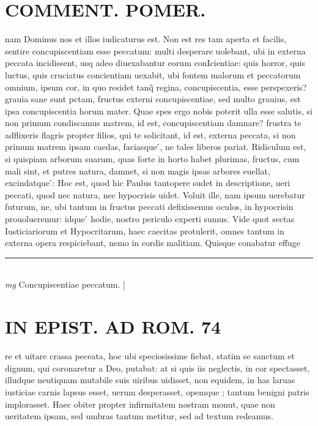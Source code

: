 \documentclass{article}
\begin{document}
\begin{pages}
\section*{COMMENT. POMER.  }\pstart nam Dominus nos et illos iudicaturus est. Non est res tam aperta et facilis, sentire concupiscentiam esse peccatum: multi desperare uolebant, ubi in externa peccata incidissent, usq adeo diuexabantur eorum conIcientiae: quis horror, quis luctus, quis cruciatus concientiam uexabit, ubi fontem malorum et peccatorum omnium, ipsum cor, in quo residet tanq̃ regina, concupiscentia, esse perspexeris? grauia sane sunt pctam, fructus externi concupiscentiae, sed multo grauius, est ipsa concupiscentia horum mater. Quae spes ergo nobis poterit ulla esse salutis, si non primum condiscamus matrem, id est, concupiscentiam damnare? frustra te adflixeris flagris propter filios, qui te solicitant, id est, externa peccata, si non primum matrem ipsam caedas, faciasque ́, ne tales liberos pariat. Ridiculum est, si quispiam arborum suarum, quas forte in horto habet plurimas, fructus, cum mali sint, et putres natura, damnet, si non magis ipsas arbores euellat, excindatque ́: Hoc est, quod hic Paulus tantopere sudet in descriptione, ueri peccati, quod nec natura, nec hypocrisis uidet. Voluit ille, nam ipsum uerebatur futurum, ne, ubi tantum in fructus peccati defixissemus oculos, in hypocrisin prouolueremur: idque ́ hodie, nostro periculo experti sumus. Vide quot sectas Iusticiariorum et Hypocritarum, haec caecitas protulerit, omnes tantum in externa opera respiciebant, nemo in cordis malitiam. Quisque conabatur effuge\pend
\vspace{0.5cm}\noindent
\vspace{0.2cm}\rule{1cm}{0.2pt}\\ 
\hspace{0.2cm}\textit{mg}
\footnotesize Concupiscentiae peccatum.  
\normalsize| 
\section*{IN EPIST. AD ROM.  74 }
\marginpar{[ p.]}\pstart re et uitare crassa peceata, hoc ubi speciosissime fiebat, statim se sanctum et dignum, qui coronaretur a Deo, putabat: at si quis iis neglectis, in cor spectasset, illudque neutiquam mutabile suis uiribus uidisset, non equidem, in has laruas iusticiae carnis lapsus esset, uerum desperasset, opemque ; tantum benigni patris implorasset. Haec obiter propter infirmitatem nostram monut, quae non ueritatem ipsam, sed umbras tantum metitur, sed ad textum redeamus.   \pend
{}
{}

\end{pages}
\end{document}
